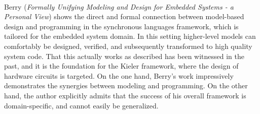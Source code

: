 

\ \hline \ %

Berry
\cite{isola-2016-berry}
({\em Formally Unifying Modeling and Design for
Embedded Systems - a Personal View})
shows the direct and formal connection between model-based design and programming in the synchronous languages framework, which is tailored for the embedded system domain. In this setting higher-level models can comfortably be designed, verified, and subsequently transformed to high quality system code. That this actually works as described has been witnessed in the past, and it is the foundation for the Kieler framework, where the design of hardware circuits is targeted. On the one hand, Berry's work impressively demonstrates the synergies between modeling and programming. On the other hand, the author explicitly admits that the success of his overall framework is domain-specific, and cannot easily be generalized.

\done{}